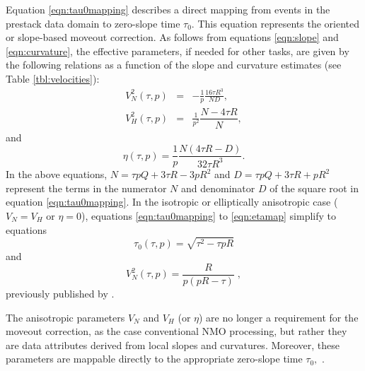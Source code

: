 Equation \ref{eqn:tau0mapping} describes a direct mapping from events
in the prestack \taup data domain to zero-slope time $\tau _{0}$. This
equation represents the oriented or slope-based moveout correction. As
follows from equations \ref{eqn:slope} and \ref{eqn:curvature}, the
effective parameters, if needed for other tasks, are given by the
following relations as a function of the slope and curvature estimates
(see Table \ref{tbl:velocities}):
\begin{eqnarray}\label{eqn:vNmap} 
V_{N}^{2}(\tau, p) &=&-\frac{1}{p}\frac{{16\tau R^{3}}}{{ND}},\\   
V_{H}^{2}(\tau, p) &=&\frac{1}{{p^{2}}}\dfrac{{N-4\tau R}}{N},  \label{eqn:vHmap}
\end{eqnarray}
and
\begin{equation}
\eta(\tau, p)=\frac{1}{p}\frac{{N(4\tau R-D)}}{{32\tau R^{3}}}.  \label{eqn:etamap}
\end{equation}
In the above equations, $N={\tau pQ+3\tau R-3pR^{2}}$ and $
D={\tau pQ+3\tau R+pR^{2}}$ represent the terms in the numerator $N$ and denominator $D$
of the square root in equation \ref{eqn:tau0mapping}. In the isotropic
or elliptically anisotropic case ($V_N=V_H$ or $\eta=0$), equations
\ref{eqn:tau0mapping} to \ref{eqn:etamap} simplify to equations
\begin{equation}
\tau _{0}(\tau ,p) = \sqrt{\tau ^{2}-\tau pR}  \label{eqn:tau0mappingISO} 
\end{equation}
and
\begin{equation}
V_{N}^{2}(\tau ,p) = \frac{R}{{p(pR-\tau )}}\;,  \label{eqn:vNmapISO}
\end{equation}
previously published by \cite{fomel:S139}.

The anisotropic parameters $V_{N}$ and $V_{H}$ (or $\eta $) are no
longer a requirement for the moveout correction, as 
 the case   conventional NMO processing, but
rather they are  data attributes derived from  local
slopes and curvatures. Moreover, these parameters are mappable
directly to the appropriate zero-slope time $\tau _{0},$   .
